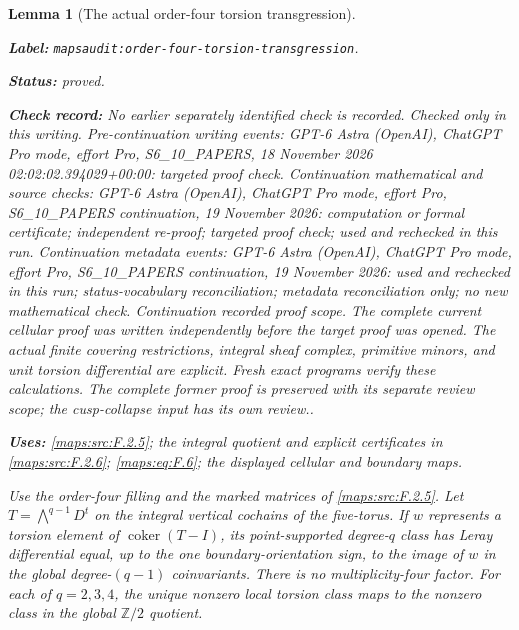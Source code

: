\documentclass[11pt,a4paper]{article}
\newtheorem{lemma}[lemma]{Lemma}
\theoremstyle{definition}
\newcommand{\StatementRecord}[4]{\par\smallskip\begingroup\upshape\raggedright\noindent\textbf{Label:} \nolinkurl{#1}.\par\noindent\textbf{Status:} #2.\par\noindent\textbf{Check record:} #3.\par\noindent\textbf{Uses:} #4.\par\endgroup\smallskip}
\begin{document}
\begin{lemma}[The actual order-four torsion transgression]
\label{mapsaudit:order-four-torsion-transgression}
\StatementRecord{mapsaudit:order-four-torsion-transgression}{proved}{No earlier separately identified check is recorded. Checked only in this writing. Pre-continuation writing events: GPT-6 Astra (OpenAI), ChatGPT Pro mode, effort Pro, S6\_10\_PAPERS, 18 November 2026 02:02:02.394029+00:00: targeted proof check. Continuation mathematical and source checks: GPT-6 Astra (OpenAI), ChatGPT Pro mode, effort Pro, S6\_10\_PAPERS continuation, 19 November 2026: computation or formal certificate; independent re-proof; targeted proof check; used and rechecked in this run. Continuation metadata events: GPT-6 Astra (OpenAI), ChatGPT Pro mode, effort Pro, S6\_10\_PAPERS continuation, 19 November 2026: used and rechecked in this run; status-vocabulary reconciliation; metadata reconciliation only; no new mathematical check. \emph{Continuation recorded proof scope.} The complete current cellular proof was written independently before the target proof was opened. The actual finite covering restrictions, integral sheaf complex, primitive minors, and unit torsion differential are explicit. Fresh exact programs verify these calculations. The complete former proof is preserved with its separate review scope; the cusp-collapse input has its own review.}{\cref{maps:src:F.2.5}; the integral quotient and explicit certificates in \cref{maps:src:F.2.6}; \cref{maps:eq:F.6}; the displayed cellular and boundary maps}

Use the order-four filling and the marked matrices of \cref{maps:src:F.2.5}.
Let $T=\bigwedge^{q-1}D^t$ on the integral vertical cochains of the
five-torus. If $w$ represents a torsion element of
$\operatorname{coker}(T-I)$, its point-supported degree-$q$ class has
Leray differential equal, up to the one boundary-orientation sign, to
the image of $w$ in the global degree-$(q-1)$ coinvariants. There is
no multiplicity-four factor. For each of $q=2,3,4$, the unique nonzero local torsion class maps
to the nonzero class in the global $\mathbb Z/2$ quotient.
\end{lemma}
\end{document}

